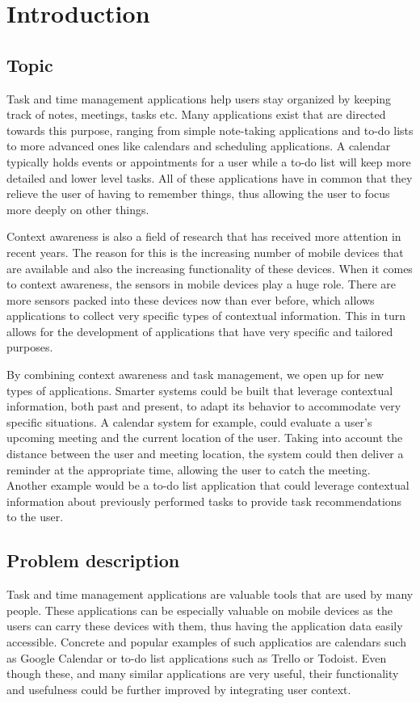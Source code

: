 \chapter{Introduction}
\label{chap:introduction}


\section{Topic}
Task and time management applications help users stay organized by keeping track of notes, meetings, tasks etc. Many applications exist that are directed towards this purpose, ranging from simple note-taking applications and to-do lists to more advanced ones like calendars and scheduling applications. A calendar typically holds events or appointments for a user while a to-do list will keep more detailed and lower level tasks. All of these applications have in common that they relieve the user of having to remember things, thus allowing the user to focus more deeply on other things.

Context awareness is also a field of research that has received more attention in recent years. The reason for this is the increasing number of mobile devices that are available and also the increasing functionality of these devices. When it comes to context awareness, the sensors in mobile devices play a huge role. There are more sensors packed into these devices now than ever before, which allows applications to collect very specific types of contextual information. This in turn allows for the development of applications that have very specific and tailored purposes.

By combining context awareness and task management, we open up for new types of applications. Smarter systems could be built that leverage contextual information, both past and present, to adapt its behavior to accommodate very specific situations. A calendar system for example, could evaluate a user's upcoming meeting and the current location of the user. Taking into account the distance between the user and meeting location, the system could then deliver a reminder at the appropriate time, allowing the user to catch the meeting. Another example would be a to-do list application that could leverage contextual information about previously performed tasks to provide task recommendations to the user.



\section{Problem description}
Task and time management applications are valuable tools that are used by many people. These applications can be especially valuable on mobile devices as the users can carry these devices with them, thus having the application data easily accessible. Concrete and popular examples of such applicatios are calendars such as Google Calendar\cite{googlecalendar} or to-do list applications such as Trello\cite{trello} or Todoist\cite{todoist}. Even though these, and many similar applications are very useful, their functionality and usefulness could be further improved by integrating user context. 

